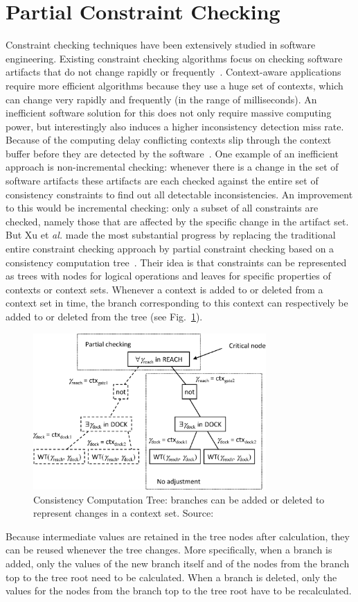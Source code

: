 \documentclass[journal]{vgtc}                %
\begin{document}
\section{Partial Constraint Checking}
Constraint checking techniques have been extensively studied in software engineering. Existing constraint checking algorithms focus on checking software artifacts that do not change rapidly or frequently~\cite{xu:2010:PCC}. Context-aware applications require more efficient algorithms because they use a huge set of contexts, which can change very rapidly and frequently (in the range of milliseconds). An inefficient software solution for this does not only require massive computing power, but interestingly also induces a higher inconsistency detection miss rate. Because of the computing delay conflicting contexts slip through the context buffer before they are detected by the software~\cite{xu:2010:PCC}. One example of an inefficient approach is non-incremental checking: whenever there is a change in the set of software artifacts these artifacts are each checked against the entire set of consistency constraints to find out all detectable inconsistencies. An improvement to this would be incremental checking: only a subset of all constraints are checked, namely those that are affected by the specific change in the artifact set. But Xu et \textit{al.} made the most substantial progress by replacing the traditional entire constraint checking approach by partial constraint checking based on a consistency computation tree~\cite{xu:2010:PCC}. Their idea is that constraints can be represented as trees with nodes for logical operations and leaves for specific properties of contexts or context sets. Whenever a context is added to or deleted from a context set in time, the branch corresponding to this context can respectively be added to or deleted from the tree (see Fig.~\ref{fig:cct}). 
\begin{figure}[htb]
  \centering
  \includegraphics[width=3.5in]{cons_comp_tree}
  \caption{Consistency Computation Tree: branches can be added or deleted to represent changes in a context set. Source:~\cite{xu:2010:PCC}}
  \label{fig:cct}
\end{figure}
Because intermediate values are retained in the tree nodes after calculation, they can be reused whenever the tree changes. More specifically, when a branch is added, only the values of the new branch itself and of the nodes from the branch top to the tree root need to be calculated. When a branch is deleted, only the values for the nodes from the branch top to the tree root have to be recalculated. 
\end{document}
